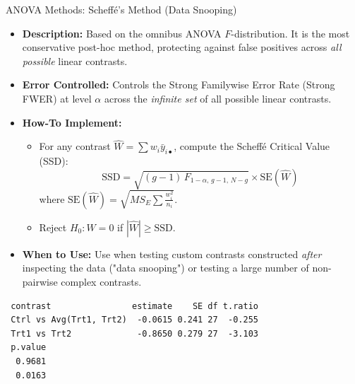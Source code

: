 \begin{frame}{ANOVA Methods: Scheffé's Method (Data Snooping)}
  \begin{itemize}
    \item \textbf{Description:} Based on the omnibus ANOVA $F$-distribution. It is the most conservative post-hoc method, protecting against false positives across \emph{all possible} linear contrasts.
    \item \textbf{Error Controlled:} Controls the \alert{Strong Familywise Error Rate (Strong FWER)} at level $\alpha$ across the \emph{infinite set} of all possible linear contrasts.
    \item \textbf{How-To Implement:}
    \begin{itemize}
      \item For any contrast $\hat{W} = \sum w_i \bar{y}_{i\bullet}$, compute the Scheffé Critical Value (SSD):
      $$
      \text{SSD} = \sqrt{(g - 1) \, F_{1-\alpha, \, g-1, \, N-g}} \times \text{SE}(\hat{W})
      $$
      where $\text{SE}(\hat{W}) = \sqrt{MS_E \sum \frac{w_i^2}{n_i}}$.
      \item Reject $H_0: W = 0$ if $|\hat{W}| \ge \text{SSD}$.
    \end{itemize}
    \item \textbf{When to Use:} Use when testing custom contrasts constructed \emph{after} inspecting the data ("data snooping") or testing a large number of non-pairwise complex contrasts.
  \end{itemize}
  
  
\begin{knitrout}\small
{}\color{fgcolor}\begin{kframe}
\begin{alltt}
 \hlkwb{<-} \hldef{(}
   \hldef{=} \hldef{(}\hldef{,} \hlopt{-}\hldef{,} \hlopt{-}\hldef{),}
              \hldef{=} \hldef{(}\hldef{,} \hldef{,} \hlopt{-}\hldef{)}
\hldef{)}

 \hlkwb{<-}   
                        \hldef{=} \hldef{)}
\end{alltt}
\begin{verbatim}
 contrast                estimate    SE df t.ratio
 Ctrl vs Avg(Trt1, Trt2)  -0.0615 0.241 27  -0.255
 Trt1 vs Trt2             -0.8650 0.279 27  -3.103
 p.value
  0.9681
  0.0163


\end{verbatim}
\end{kframe}
\end{knitrout}
\end{frame}
